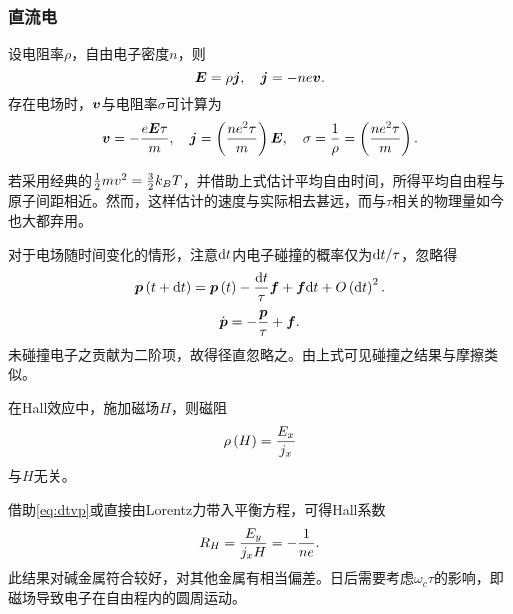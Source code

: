 \documentclass{ctexart}
\begin{document}
\subsubsection{直流电}
设电阻率$\rho$，自由电子密度$n$，则
\[ \boldsymbol{E} = \rho \boldsymbol{j}, \quad \boldsymbol{j} = -ne\boldsymbol{v}. \]
存在电场时，$\boldsymbol{v}$与电阻率$\sigma$可计算为
\begin{equation}
\label{eq:rhotau}
\boldsymbol{v} = -\frac{e\boldsymbol{E} \tau}{m}, \quad \boldsymbol{j} = \left(\frac{ne^2\tau}{m}\right)\boldsymbol{E}, \quad \sigma = \frac{1}{\rho} =  \left(\frac{ne^2\tau}{m}\right).
\end{equation}
\par
若采用经典的$\frac{1}{2} mv^2 = \frac{3}{2} k_B T$，并借助上式估计平均自由时间，所得平均自由程与原子间距相近。然而，这样估计的速度与实际相去甚远，而与$\tau$相关的物理量如今也大都弃用。
\par
对于电场随时间变化的情形，注意$\mathrm{d} t$内电子碰撞的概率仅为$\mathrm{d} t/\tau$，忽略得
\[ \boldsymbol{p}\left(t+\mathrm{d} t\right) = \boldsymbol{p}\left(t\right) - \frac{\mathrm{d} t}{\tau}\boldsymbol{f} + \boldsymbol{f}\mathrm{d} t + O\left(\mathrm{d} t\right)^2. \]
\begin{equation}
\label{eq:dtvp}
\dot{\boldsymbol{p}} = -\frac{\boldsymbol{p}}{\tau} + \boldsymbol{f}.
\end{equation}
未碰撞电子之贡献为二阶项，故得径直忽略之。由上式可见碰撞之结果与摩擦类似。
\par
在Hall效应中，施加磁场$H$，则磁阻
\[ \rho\left(H\right) = \frac{E_x}{j_x} \]
与$H$无关。
\par
借助\eqref{eq:dtvp}或直接由Lorentz力带入平衡方程，可得Hall系数
\[ R_H = \frac{E_y}{j_x H} = -\frac{1}{ne}. \]
此结果对碱金属符合较好，对其他金属有相当偏差。日后需要考虑$\omega_c \tau$的影响，即磁场导致电子在自由程内的圆周运动。
\end{document}
